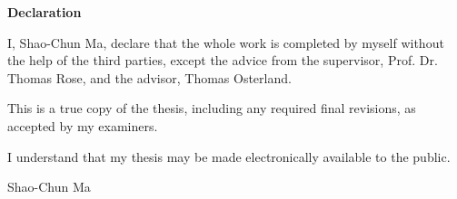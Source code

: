 \thispagestyle{plain}
\vspace*{\fill}
    \begin{center}
        \Large
        \textbf{Declaration}
    \end{center}

    \vspace{1cm}

    I, Shao-Chun Ma, declare that the whole work is completed by myself without the help of the third parties, except the advice from the supervisor, Prof. Dr. Thomas Rose, and the advisor, Thomas Osterland. 
    
    This is a true copy of the thesis, including any required final revisions, as accepted by my examiners.

    I understand that my thesis may be made electronically available to the public.

     Shao-Chun Ma
\vspace*{\fill}
